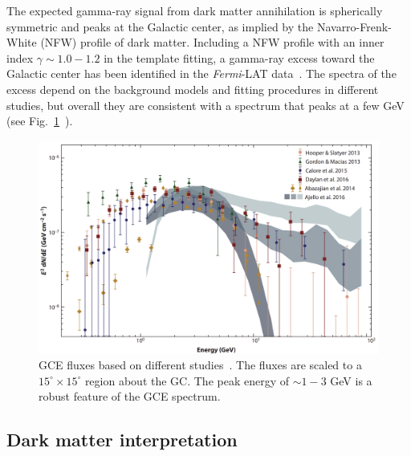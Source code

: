 \documentclass[doublespace,nopageskip]{VTthesis} %
\begin{document}
The expected gamma-ray signal from dark matter annihilation is spherically symmetric and peaks at the Galactic center, as implied by the Navarro-Frenk-White (NFW) profile of dark matter. Including a NFW profile with an inner index $\gamma \sim 1.0 - 1.2$ in the template fitting, a gamma-ray excess toward the Galactic center has been identified in the \textit{Fermi}-LAT data~\cite{2009arXiv0910.2998G, 2009arXiv0912.3828V,2011PhLB..697..412H,2012PhRvD..86h3511A,2013PhRvD..88h3521G,2014PhRvD..89f3515M,2013PDU.....2..118H,2014PhRvD..90b3526A,2016PDU....12....1D,2015JCAP...03..038C,2015PhRvD..91l3010Z,2016ApJ...819...44A,2017ApJ...840...43A}. The spectra of the excess depend on the background models and fitting procedures in different studies, but overall they are consistent with a spectrum that peaks at a few GeV (see Fig.~\ref{fig:gce_spectra}~\cite{Murgia:2020dzu}).
\begin{figure}[htb]
    \centering
    \includegraphics[width=\textwidth]{Figures/Intro/gcespectrum.png}
    \caption{GCE fluxes based on different studies~\cite{Murgia:2020dzu}. The fluxes are scaled to a $15^\circ \times 15^\circ$ region about the GC. The peak energy of $\sim 1 - 3$ GeV is a robust feature of the GCE spectrum.}
    \label{fig:gce_spectra}
\end{figure}

\subsection{Dark matter interpretation}
\end{document}
